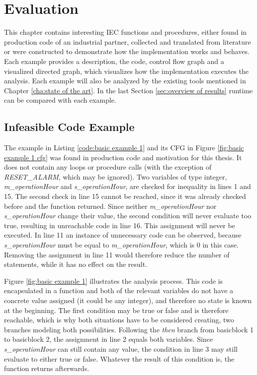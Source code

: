 
\chapter {Evaluation}
\label {cha:evaluation}
This chapter contains interesting IEC functions and procedures, either found in production code of an industrial partner, collected and translated from literature or were constructed to demonstrate how the implementation works and behaves.
Each example provides a description, the code, control flow graph and a visualized directed graph, which visualizes how the implementation executes the analysis. Each example will also be analyzed by the existing tools mentioned in Chapter \ref{cha:state of the art}. In the last Section \ref{sec:overview of results} runtime can be compared with each example.

\section{Infeasible Code Example}
The example in Listing \ref{code:basic example 1} and its CFG in Figure \ref{fig:basic example 1 cfg} was found in production code and motivation for this thesis. It does not contain any loops or procedure calls (with the exception of \emph{RESET\_ALARM}, which may be ignored). Two variables of type integer, \emph{m\_operationHour} and \emph{s\_operationHour}, are checked for inequality in lines 1 and 15. The second check in line 15 cannot be reached, since it was already checked before and the function returned. Since neither \emph{m\_operationHour} nor \emph{s\_operationHour} change their value, the second condition will never evaluate too true, resulting in unreachable code in line 16. This assignment will never be executed. 
In line 11 an instance of unnecessary code can be observed, because \emph{s\_operationHour} must be equal to \emph{m\_operationHour}, which is 0 in this case. Removing the assignment in line 11 would therefore reduce the number of statements, while it has no effect on the result.


Figure \ref{fig:basic example 1} illustrates the analysis process. This code is encapsulated in a function and both of the relevant variables do not have a concrete value assigned (it could be any integer), and therefore no state is known at the beginning. The first condition may be true or false and is therefore reachable, which is why both situations have to be considered creating, two branches modeling both possibilities. Following the \emph{then} branch from basicblock 1 to basicblock 2, the assignment in line 2 equals both variables. Since \emph{s\_operationHour} can still contain any value, the condition in line 3 may still evaluate to either true or false. Whatever the result of this condition is, the function returns afterwards.

